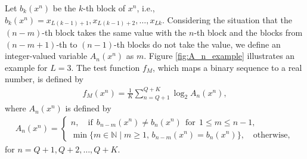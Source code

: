 %
Let $b_k(x^n)$ be the $k$-th block of $x^n$, i.e., $b_k(x^n) = x_{L(k-1)+1}, x_{L(k-1)+2}, \dots, x_{Lk}$. Considering the situation that the $(n-m)$-th block takes the same value with the $n$-th block and the blocks from $(n-m+1)$-th to $(n-1)$-th blocks do not take the value, we define an integer-valued variable $A_n(x^n)$ as $m$. 
%
Figure \ref{fig:A_n_example} illustrates an example for $L=3$. The test function $f_M$, which maps a binary sequence to a real number, is defined by 
\begin{align}\label{eq:fM}
	f_M(x^n) = \frac{1}{K} \sum_{n=Q+1}^{Q+K} \log_2 A_n(x^n),
\end{align}
where $A_n(x^n)$ is defined by
\begin{align}\label{eq:An}
	A_{n}(x^n) = \left\{ \begin{array}{ll}
	n, \quad \text{if} \:\: b_{n-m}(x^n) \neq b_n(x^n) \:\: \text{for} \:\: 1 \leq m \leq n-1, \\
	\min \{ m\in\mathbb{N} \mid m \geq 1,\, b_{n-m}(x^n) = b_n(x^n) \}, \quad \text{otherwise},
	\end{array} \right.
\end{align}
for $n=Q+1,Q+2,\dots,Q+K$.
